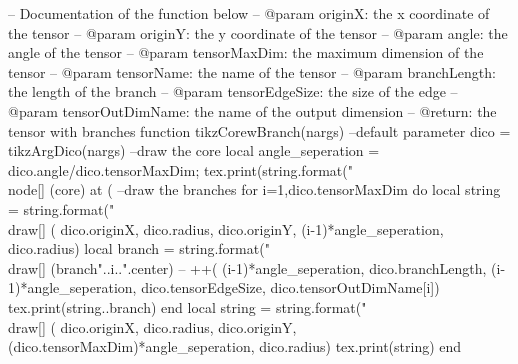 \begin{luacode*}
	-- Documentation of the function below
	-- @param originX: the x coordinate of the tensor
	-- @param originY: the y coordinate of the tensor
	-- @param angle: the angle of the tensor
	-- @param tensorMaxDim: the maximum dimension of the tensor
	-- @param tensorName: the name of the tensor
	-- @param branchLength: the length of the branch
	-- @param tensorEdgeSize: the size of the edge
	-- @param tensorOutDimName: the name of the output dimension
	-- @return: the tensor with branches
	function tikzCorewBranch(nargs)
		--default parameter
		dico = tikzArgDico(nargs)
		--draw the core
		local angle_seperation = dico.angle/dico.tensorMaxDim;
		tex.print(string.format("\\node[] (core) at (%
		--draw the branches
		for i=1,dico.tensorMaxDim do
			local string = string.format("\\draw[] (%
			dico.originX, dico.radius, dico.originY, (i-1)*angle_seperation, dico.radius)
			local branch = string.format("\\draw[] (branch"..i..".center) -- ++(%
			(i-1)*angle_seperation, dico.branchLength, (i-1)*angle_seperation, dico.tensorEdgeSize, dico.tensorOutDimName[i])
			tex.print(string..branch)
		end
		local string = string.format("\\draw[] (%
		dico.originX, dico.radius, dico.originY, (dico.tensorMaxDim)*angle_seperation, dico.radius)
		tex.print(string)
	end


\end{luacode*}
